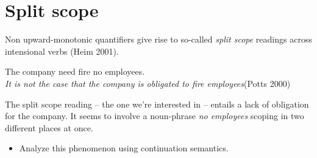 \documentclass[nols,twoside,nofonts,nobib,nohyper]{tufte-handout}
\begin{document}
\section{Split scope}

Non upward-monotonic quantifiers give rise to so-called \textit{split scope}
readings across intensional verbs (Heim 2001).

\ex
The company need fire no employees.\\
\textit{It is not the case that the company is obligated to fire
  employees}\hfill (Potts 2000)
\xe

The split scope reading -- the one we're interested in -- entails a lack of
obligation for the company. It seems to involve a noun-phrase \textit{no
  employees} scoping in two different places at once.

\begin{itemize}

    \item Analyze this phenomenon using continuation semantics.

\end{itemize}
\end{document}

